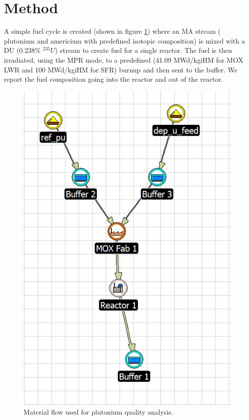 \documentclass{report}
\begin{document}
\section{Method}

A simple fuel cycle is created (shown in figure \ref{fig:flow}) where an \gls{MA} stream
( plutonium and americium with predefined isotopic composition) is mixed with a \gls{DU} (0.238\% $^{235}U$)
stream to create fuel for a single reactor. The fuel is then irradiated, using the MPR mode, to a predefined (41.09 MWd/kgiHM for \gls{MOX} \gls{LWR}
and 100 MWd/kgiHM for \gls{SFR}) burnup and then sent to the buffer. We report the fuel composition going into the
reactor and out of the reactor.

\begin{figure}[htbp!]
    \begin{center}
        \includegraphics[scale=1.0]{./flow.jpg}
    \end{center}
    \caption{Material flow used for plutonium quality analysis.}
    \label{fig:flow}
\end{figure}
\end{document}
